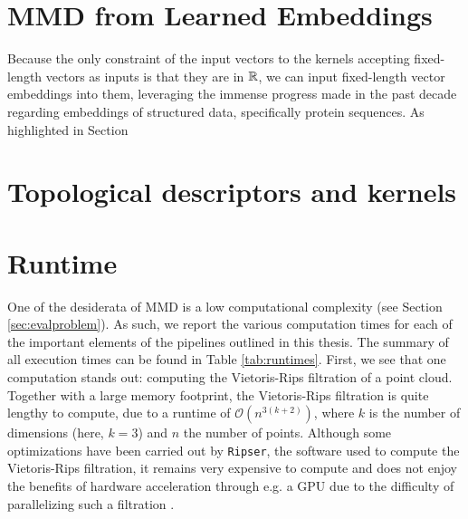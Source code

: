 \section{MMD from Learned Embeddings}

Because the only constraint of the input vectors to the kernels accepting
fixed-length vectors as inputs is that they are in $\mathbb{R}$, we can input
fixed-length vector embeddings into them, leveraging the immense progress made
in the past decade regarding embeddings of structured data, specifically protein
sequences. As highlighted in Section

\section{Topological descriptors and kernels}

\section{Runtime}\label{sec:results_runtime}

One of the desiderata of MMD is a low computational complexity (see Section
\ref{sec:evalproblem}). As such, we report the various computation times for
each of the important elements of the pipelines outlined in this thesis. The
summary of all execution times can be found in Table \ref{tab:runtimes}. First,
we see that one computation stands out: computing the Vietoris-Rips filtration
of a point cloud. Together with a large memory footprint, the Vietoris-Rips
filtration is quite lengthy to compute, due to a runtime of
$\mathcal{O}(n^{3(k+2)})$, where $k$ is the number of dimensions (here, $k=3$) and
$n$ the number of points. Although some optimizations have been carried out by
\texttt{Ripser}, the software used to compute the Vietoris-Rips filtration, it
remains very expensive to compute and does not enjoy the benefits of hardware
acceleration through e.g. a GPU due to the difficulty of parallelizing such a filtration \cite{Bauer2021Ripser}.


